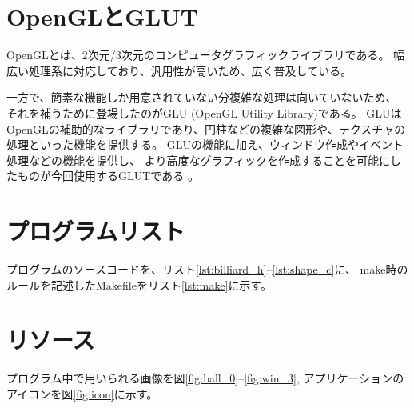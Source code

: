 \documentclass[a4j,titlepage]{jsarticle}
\begin{document}
\section{OpenGLとGLUT}
OpenGLとは、2次元/3次元のコンピュータグラフィックライブラリである。
幅広い処理系に対応しており、汎用性が高いため、広く普及している。

一方で、簡素な機能しか用意されていない分複雑な処理は向いていないため、
それを補うために登場したのがGLU (OpenGL Utility Library)である。
GLUはOpenGLの補助的なライブラリであり、円柱などの複雑な図形や、テクスチャの処理といった機能を提供する。
GLUの機能に加え、ウィンドウ作成やイベント処理などの機能を提供し、
より高度なグラフィックを作成することを可能にしたものが今回使用するGLUTである \cite{bib:1}。


\section{プログラムリスト}
プログラムのソースコードを、リスト\ref{lst:billiard_h}--\ref{lst:shape_c}に、
make時のルールを記述したMakefileをリスト\ref{lst:make}に示す。
























\section{リソース}
プログラム中で用いられる画像を図\ref{fig:ball_0}--\ref{fig:win_3}, アプリケーションのアイコンを図\ref{fig:icon}に示す。
\end{document}
